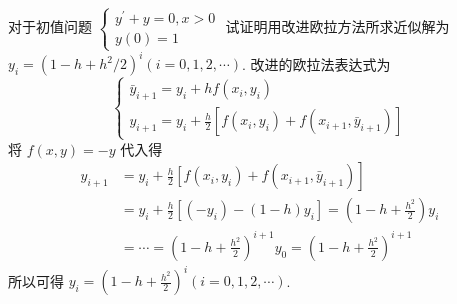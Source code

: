  
\begin{tcolorbox}[enhanced,colback=8,colframe=7,breakable,coltitle=green!25!black,title=2024]
 对于初值问题
$
\left\{\begin{array}{l}
y^{\prime}+y=0, x>0 \\
y(0)=1
\end{array}\right.
$
试证明用改进欧拉方法所求近似解为 $ y_{i}=\left(1-h+h^{2} / 2\right)^{i}(i=0,1,2, \cdots) $.
\tcblower
 改进的欧拉法表达式为
$$
\left\{\begin{array}{l}
\bar{y}_{i+1}=y_{i}+h f\left(x_{i}, y_{i}\right) \\
y_{i+1}=y_{i}+\frac{h}{2}\left[f\left(x_{i}, y_{i}\right)+f\left(x_{i+1}, \bar{y}_{i+1}\right)\right]
\end{array}\right.
$$
将 $ f(x, y)=-y $ 代入得
$$
\begin{aligned}
y_{i+1}&=y_{i}+\frac{h}{2}\left[f\left(x_{i}, y_{i}\right)+\right.\left.f\left(x_{i+1}, \bar{y}_{i+1}\right)\right]\\&=y_{i}+\frac{h}{2}\left[\left(-y_{i}\right)-(1-h) y_{i}\right]=\left(1-h+\frac{h^{2}}{2}\right) y_{i} \\
&=\cdots=\left(1-h+\frac{h^{2}}{2}\right)^{i+1} y_{0}=\left(1-h+\frac{h^{2}}{2}\right)^{i+1}
\end{aligned}
$$
所以可得 $ y_{i}=\left(1-h+\frac{h^{2}}{2}\right)^{i}(i=0,1,2, \cdots) $.
\end{tcolorbox}
